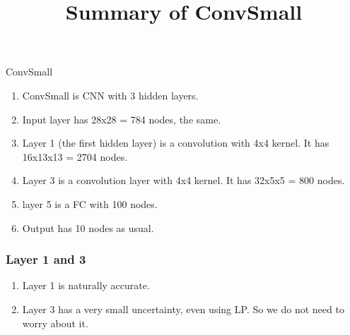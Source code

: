\documentclass[10pt,table, UTF8]{beamer}
\title{Summary of ConvSmall}
\theoremstyle{mydef}
\numberwithin{equation}{section}
\begin{document}
\begin{frame}{ConvSmall}
	
	\begin{enumerate}
		\item ConvSmall is CNN with 3 hidden layers.
		
		\vspace*{1ex}
		
		\item  Input layer has 28x28 = 784 nodes, the same.
		
		\vspace*{1ex}
		
		\item Layer 1 (the first hidden layer) is a convolution with 4x4 kernel. It has 16x13x13 = 2704 nodes.
		
		\vspace*{1ex}
		
		\item  Layer 3 is a convolution layer with 4x4 kernel. It has 32x5x5 = 800 nodes.
		
		\vspace*{1ex}
		
		\item  layer 5 is a FC with 100 nodes.
		
		\vspace*{1ex}
		
		\item  Output has 10 nodes as usual.
	\end{enumerate}
	
	
	
	
\end{frame}


\begin{frame}
	\frametitle{Layer 1 and 3}
	

	\begin{enumerate}
		\item Layer 1 is naturally accurate.
		
		\vspace*{2ex}
		
		\item  Layer 3 has a very small uncertainty, even using LP. So we do not need to worry about it.
	\end{enumerate}


\end{frame}
\end{document}
